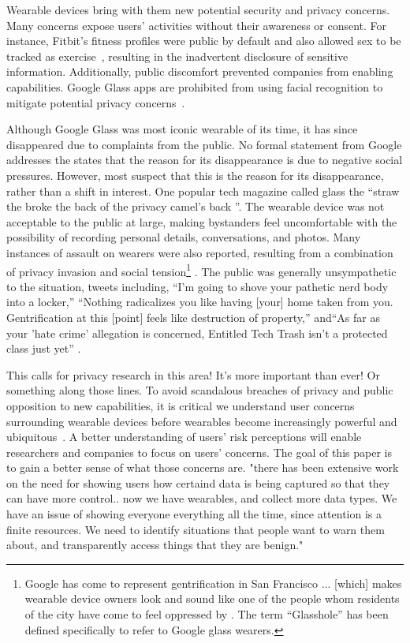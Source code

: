 Wearable devices bring with them new potential security and privacy concerns. Many concerns expose users' activities without their awareness or consent. For instance, Fitbit's fitness profiles were public by default and also allowed sex to be tracked as exercise~\cite{Fitbit}, resulting in the inadvertent disclosure of sensitive information. Additionally, public discomfort prevented companies from enabling capabilities. Google Glass apps are prohibited from using facial recognition to mitigate potential privacy concerns~\cite{GlassDetection}.

Although Google Glass was most iconic wearable of its time, it has since disappeared due to complaints from the public\cite{13_google_2015}. No formal statement from Google addresses the states that the reason for its disappearance is due to negative social pressures. However, most suspect that this is the reason for its disappearance, rather than a shift in interest. One popular tech magazine called glass the ``straw the broke the back of the privacy camel's back \cite{14_dvorak_2014}''. The wearable device was not acceptable to the public at large, making bystanders feel uncomfortable with the possibility of recording personal details, conversations, and photos. Many instances of assault \cite{1_russell_2014, 15_mashable_2014, 16_gross_2014} on wearers were also reported, resulting from a combination of privacy invasion and social tension\footnote{Google has come to represent gentrification in San Francisco ... [which] makes wearable device owners look and sound like one of the people whom residents of the city have come to feel oppressed by \cite{17_matyszczyk_2014}. The term ``Glasshole'' \cite{18_google_2015} has been defined specifically to refer to Google glass wearers.} . The public was generally unsympathetic to the situation, tweets including, ``I'm going to shove your pathetic nerd body into a locker,'' ``Nothing radicalizes you like having [your] home taken from you. Gentrification at this [point] feels like destruction of property,'' and``As far as your 'hate crime' allegation is concerned, Entitled Tech Trash isn't a protected class just yet'' \cite{1_russell_2014,15_mashable_2014}.

{\color {red} This calls for privacy research in this area! It's more important than ever! Or something along those lines.}  To avoid scandalous breaches of privacy and public opposition to new capabilities, it is critical we understand user concerns surrounding wearable devices before wearables become increasingly powerful and ubiquitous~\cite{Implants}. A better understanding of users' risk perceptions will enable researchers and companies to focus on users' concerns. The goal of this paper is to gain a better sense of what those concerns are.  {\color {red} "there has been extensive work on the need for showing users how certaind data is being captured so that they can have more control.. now we have wearables, and collect more data types. We have an issue of showing everyone everything all the time, since attention is a finite resources. We need to identify situations that people want to warn them about, and transparently access things that they are benign."}

